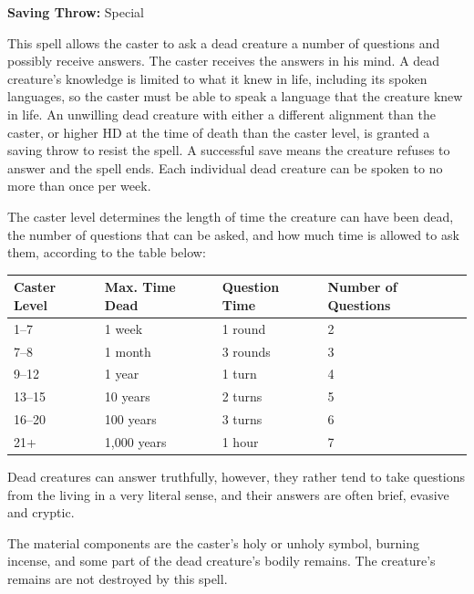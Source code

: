 \begin{multicols}{2}
\begin{minipage}{\columnwidth}
\noindent \textbf{Saving Throw:} Special

\end{minipage}

This spell allows the caster to ask a dead creature a number of questions and possibly receive answers.  The caster receives the answers in his mind.  A dead creature's knowledge is limited to what it knew in life, including its spoken languages, so the caster must be able to speak a language that the creature knew in life.  An unwilling dead creature with either a different alignment than the caster, or higher HD at the time of death than the caster level, is granted a saving throw to resist the spell.  A successful save means the creature refuses to answer and the spell ends.  Each individual dead creature can be spoken to no more than once per week.  

The caster level determines the length of time the creature can have been dead, the number of questions that can be asked, and how much time is allowed to ask them, according to the table below:  

\noindent
\begin{tabular}{|p{}|p{}|p{}|p{}|}
\hline
Caster Level	& Max. Time Dead	& Question Time	& Number of Questions \\
\hline\hline
\rowcolor[gray]{.9}1--7	& 1 week	& 1 round	& 2 \\
7--8	& 1 month	& 3 rounds	& 3 \\
\rowcolor[gray]{.9}9--12	& 1 year	& 1 turn	& 4 \\
13--15	& 10 years	& 2 turns	& 5 \\
\rowcolor[gray]{.9}16--20	& 100 years	& 3 turns	& 6 \\
21+	& 1,000 years	& 1 hour	& 7 \\
\hline
\end{tabular}

Dead creatures can answer truthfully, however, they rather tend to take questions from the living in a very literal sense, and their answers are often brief, evasive and cryptic.

The material components are the caster's holy or unholy symbol, burning incense, and some part of the dead creature's bodily remains.  The creature's remains are not destroyed by this spell.

\vspace{1em}

\noindent
\begin{minipage}{\columnwidth}


\end{minipage}
\end{multicols}
